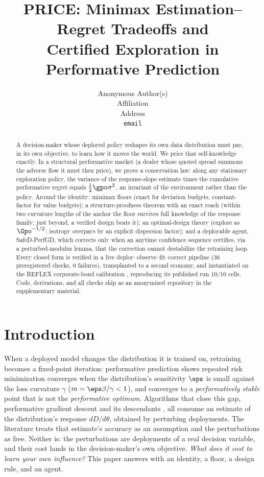 \documentclass{article}
\title{PRICE: Minimax Estimation--Regret Tradeoffs and\\ Certified Exploration in Performative Prediction}
\author{%
  Anonymous Author(s) \\
  Affiliation \\
  Address \\
  \texttt{email} \\
}
\begin{document}
\maketitle

\begin{abstract}
A decision-maker whose deployed policy reshapes its own data distribution must pay, in its own objective, to learn how it moves the world. We price that self-knowledge exactly. In a structural performative market (a dealer whose quoted spread summons the adverse flow it must then price), we prove a conservation law: along any stationary exploration policy, the variance of the response-slope estimate times the cumulative performative regret equals $\tfrac{1}{2}\gpo\sigma^2$, an invariant of the environment rather than the policy. Around the identity: minimax floors (exact for deviation budgets, constant-factor for value budgets); a structure-proofness theorem with an exact reach (within two curvature lengths of the anchor the floor survives full knowledge of the response family; just beyond, a verified design beats it); an optimal-design theory (explore as $\Gpo^{-1/2}$; isotropy overpays by an explicit dispersion factor); and a deployable agent, SafeD-PerfGD, which corrects only when an anytime confidence sequence certifies, via a perturbed-modulus lemma, that the correction cannot destabilize the retraining loop. Every closed form is verified in a live deploy--observe--fit--correct pipeline (36 preregistered checks, 0 failures), transplanted to a second economy, and instantiated on the REFLEX corporate-bond calibration \citep{reflex2026}, reproducing its published run 10/10 cells. Code, derivations, and all checks ship as an anonymized repository in the supplementary material.
\end{abstract}

\section{Introduction}
\label{sec:intro}

When a deployed model changes the distribution it is trained on, retraining becomes a fixed-point iteration: performative prediction \citep{perdomo2020performative,hardt2023performative} shows repeated risk minimization converges when the distribution's sensitivity $\eps$ is small against the loss curvature $\gamma$ ($m = \eps\beta/\gamma < 1$), and converges to a \emph{performatively stable} point that is not the \emph{performative optimum}. Algorithms that close this gap, performative gradient descent and its descendants \citep{izzo2021learn,miller2021outside,mendler2020stochastic,drusvyatskiy2022stochastic,li2022state,brown2022performative}, all consume an estimate of the distribution's response $dD/d\theta$, obtained by perturbing deployments. The literature treats that estimate's accuracy as an assumption and the perturbations as free. Neither is: the perturbations are deployments of a real decision variable, and their cost lands in the decision-maker's own objective. \emph{What does it cost to learn your own influence?} This paper answers with an identity, a floor, a design rule, and an agent.
\end{document}
